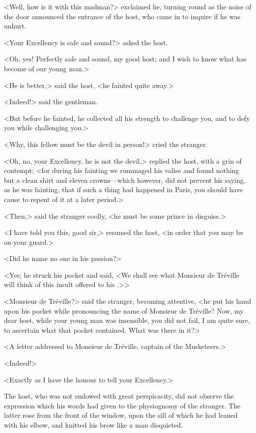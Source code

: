 <Well, how is it with this madman?> exclaimed he, turning round as the noise of the door announced the entrance of the host, who came in to inquire if he was unhurt. 

<Your Excellency is safe and sound?> asked the host. 

<Oh, yes! Perfectly safe and sound, my good host; and I wish to know what has become of our young man.> 

<He is better,> said the host, <he fainted quite away.> 

<Indeed!> said the gentleman. 

<But before he fainted, he collected all his strength to challenge you, and to defy you while challenging you.> 

<Why, this fellow must be the devil in person!> cried the stranger. 

<Oh, no, your Excellency, he is not the devil,> replied the host, with a grin of contempt; <for during his fainting we rummaged his valise and found nothing but a clean shirt and eleven crowns—which however, did not prevent his saying, as he was fainting, that if such a thing had happened in Paris, you should have cause to repent of it at a later period.> 

<Then,> said the stranger coolly, <he must be some prince in disguise.> 

<I have told you this, good sir,> resumed the host, <in order that you may be on your guard.> 

<Did he name no one in his passion?> 

<Yes; he struck his pocket and said, <We shall see what Monsieur de Tréville will think of this insult offered to his .>> 

<Monsieur de Tréville?> said the stranger, becoming attentive, <he put his hand upon his pocket while pronouncing the name of Monsieur de Tréville? Now, my dear host, while your young man was insensible, you did not fail, I am quite sure, to ascertain what that pocket contained. What was there in it?> 

<A letter addressed to Monsieur de Tréville, captain of the Musketeers.> 

<Indeed!> 

<Exactly as I have the honour to tell your Excellency.> 

The host, who was not endowed with great perspicacity, did not observe the expression which his words had given to the physiognomy of the stranger. The latter rose from the front of the window, upon the sill of which he had leaned with his elbow, and knitted his brow like a man disquieted. 

